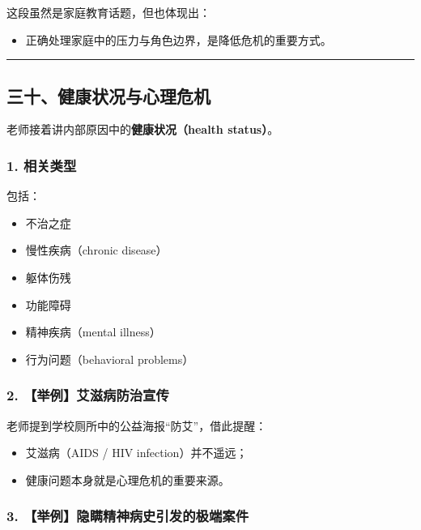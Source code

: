 \documentclass[
  chinese,
  9pt,
  a4paper,
]{ctexart}
\providecommand{\tightlist}{%
  \setlength{\itemsep}{0pt}\setlength{\parskip}{0pt}}
\begin{document}
这段虽然是家庭教育话题，但也体现出：

\begin{itemize}
\tightlist
\item
  正确处理家庭中的压力与角色边界，是降低危机的重要方式。
\end{itemize}

\begin{center}\rule{0.5\linewidth}{0.5pt}\end{center}

\subsection{三十、健康状况与心理危机}\label{ux4e09ux5341ux5065ux5eb7ux72b6ux51b5ux4e0eux5fc3ux7406ux5371ux673a}

老师接着讲内部原因中的\textbf{健康状况（health status）}。

\subsubsection{1. 相关类型}\label{ux76f8ux5173ux7c7bux578b}

包括：

\begin{itemize}
\tightlist
\item
  不治之症
\item
  慢性疾病（chronic disease）
\item
  躯体伤残
\item
  功能障碍
\item
  精神疾病（mental illness）
\item
  行为问题（behavioral problems）
\end{itemize}

\subsubsection{2.
【举例】艾滋病防治宣传}\label{ux4e3eux4f8bux827eux6ecbux75c5ux9632ux6cbbux5ba3ux4f20}

老师提到学校厕所中的公益海报``防艾''，借此提醒：

\begin{itemize}
\tightlist
\item
  艾滋病（AIDS / HIV infection）并不遥远；
\item
  健康问题本身就是心理危机的重要来源。
\end{itemize}

\subsubsection{3.
【举例】隐瞒精神病史引发的极端案件}\label{ux4e3eux4f8bux9690ux7792ux7cbeux795eux75c5ux53f2ux5f15ux53d1ux7684ux6781ux7aefux6848ux4ef6}
\end{document}
